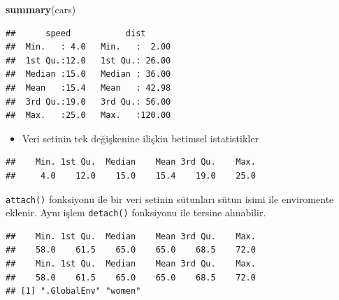 \documentclass[
  oneside]{book}
\newenvironment{Shaded}{\begin{snugshade}}{\end{snugshade}}
\newcommand{\CommentTok}[1]{\textcolor[rgb]{0.56,0.35,0.01}{\textit{#1}}}
\newcommand{\FloatTok}[1]{\textcolor[rgb]{0.00,0.00,0.81}{#1}}
\newcommand{\FunctionTok}[1]{\textcolor[rgb]{0.13,0.29,0.53}{\textbf{#1}}}
\newcommand{\NormalTok}[1]{#1}
\newcommand{\OtherTok}[1]{\textcolor[rgb]{0.56,0.35,0.01}{#1}}
\newcommand{\SpecialCharTok}[1]{\textcolor[rgb]{0.81,0.36,0.00}{\textbf{#1}}}
\newcommand{\StringTok}[1]{\textcolor[rgb]{0.31,0.60,0.02}{#1}}
\providecommand{\tightlist}{%
  \setlength{\itemsep}{0pt}\setlength{\parskip}{0pt}}
\begin{document}
\begin{Shaded}
\begin{Highlighting}[]
\FunctionTok{summary}\NormalTok{(cars)}
\end{Highlighting}
\end{Shaded}

\begin{verbatim}
##      speed           dist       
##  Min.   : 4.0   Min.   :  2.00  
##  1st Qu.:12.0   1st Qu.: 26.00  
##  Median :15.0   Median : 36.00  
##  Mean   :15.4   Mean   : 42.98  
##  3rd Qu.:19.0   3rd Qu.: 56.00  
##  Max.   :25.0   Max.   :120.00
\end{verbatim}

\begin{itemize}
\tightlist
\item
  Veri setinin tek değişkenine ilişkin betimsel istatistikler
\end{itemize}

\begin{Shaded}
\end{Shaded}

\begin{verbatim}
##    Min. 1st Qu.  Median    Mean 3rd Qu.    Max. 
##     4.0    12.0    15.0    15.4    19.0    25.0
\end{verbatim}

\texttt{attach()} fonksiyonu ile bir veri setinin sütunları sütun isimi ile enviromente eklenir. Aynı işlem \texttt{detach()} fonksiyonu ile tersine alınabilir.

\begin{Shaded}
\end{Shaded}

\begin{verbatim}
##    Min. 1st Qu.  Median    Mean 3rd Qu.    Max. 
##    58.0    61.5    65.0    65.0    68.5    72.0 
##    Min. 1st Qu.  Median    Mean 3rd Qu.    Max. 
##    58.0    61.5    65.0    65.0    68.5    72.0 
## [1] ".GlobalEnv" "women"
\end{verbatim}
\end{document}

